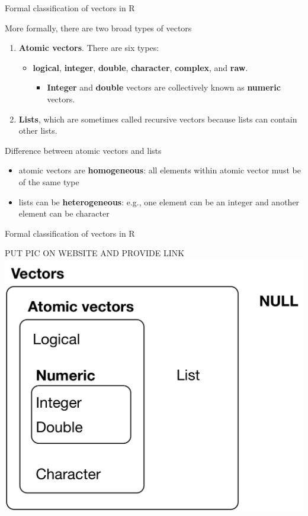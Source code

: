 \documentclass[10pt,ignorenonframetext,]{beamer}
\providecommand{\tightlist}{%
  \setlength{\itemsep}{0pt}\setlength{\parskip}{0pt}}
\begin{document}
\begin{frame}{Formal classification of vectors in R}

More formally, there are two broad types of vectors

\begin{enumerate}
\def\labelenumi{\arabic{enumi}.}
\tightlist
\item
  \textbf{Atomic vectors}. There are six types:

  \begin{itemize}
  \tightlist
  \item
    \textbf{logical}, \textbf{integer}, \textbf{double},
    \textbf{character}, \textbf{complex}, and \textbf{raw}.

    \begin{itemize}
    \tightlist
    \item
      \textbf{Integer} and \textbf{double} vectors are collectively
      known as \textbf{numeric} vectors.
    \end{itemize}
  \end{itemize}
\item
  \textbf{Lists}, which are sometimes called recursive vectors because
  lists can contain other lists.
\end{enumerate}

Difference between atomic vectors and lists

\begin{itemize}
\tightlist
\item
  atomic vectors are \textbf{homogeneous}: all elements within atomic
  vector must be of the same type
\item
  lists can be \textbf{heterogeneous}: e.g., one element can be an
  integer and another element can be character
\end{itemize}

\end{frame}

\begin{frame}{Formal classification of vectors in R}

PUT PIC ON WEBSITE AND PROVIDE LINK
\includegraphics{data-structures-overview.png}

\end{frame}
\end{document}
